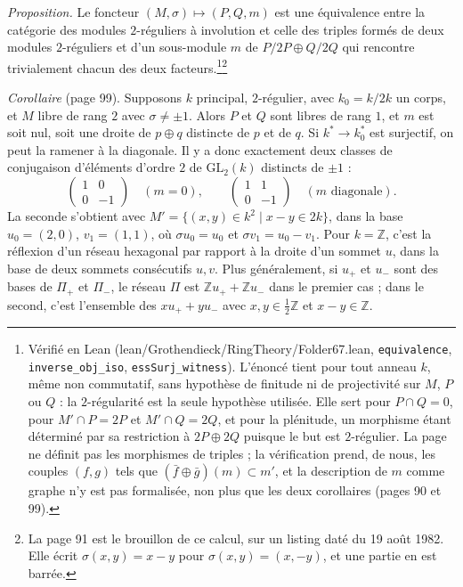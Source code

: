 \documentclass[11pt,a4paper]{article}
\begin{document}
\emph{Proposition.} Le foncteur $(M, \sigma) \mapsto (P, Q, m)$ est une
équivalence entre la catégorie des modules $2$-réguliers à involution et celle
des triples formés de deux modules $2$-réguliers et d'un sous-module $m$ de
$P/2P \oplus Q/2Q$ qui rencontre trivialement chacun des deux
facteurs.\footnote{Vérifié en Lean
(lean/Grothendieck/RingTheory/Folder67.lean, \texttt{equivalence},
\texttt{inverse\_obj\_iso}, \texttt{essSurj\_witness}). L'énoncé tient pour
tout anneau $k$, même non commutatif, sans hypothèse de finitude ni de
projectivité sur $M$, $P$ ou $Q$ : la $2$-régularité est la seule hypothèse
utilisée. Elle sert pour $P \cap Q = 0$, pour $M' \cap P = 2P$ et
$M' \cap Q = 2Q$, et pour la plénitude, un morphisme étant déterminé par sa
restriction à $2P \oplus 2Q$ puisque le but est $2$-régulier. La page ne
définit pas les morphismes de triples ; la vérification prend, de nous, les
couples $(f, g)$ tels que $(\bar f \oplus \bar g)(m) \subset m'$, et la
description de $m$ comme graphe n'y est pas formalisée, non plus que les deux
corollaires (pages 90 et 99).}\footnote{La page 91 est le brouillon de ce calcul, sur un listing
daté du 19 août 1982. Elle écrit $\sigma(x,y) = x - y$ pour
$\sigma(x,y) = (x, -y)$, et une partie en est barrée.}

\emph{Corollaire} (page 99). Supposons $k$ principal, $2$-régulier, avec
$k_0 = k/2k$ un corps, et $M$ libre de rang $2$ avec $\sigma \neq \pm 1$.
Alors $P$ et $Q$ sont libres de rang $1$, et $m$ est soit nul, soit une
droite de $p \oplus q$ distincte de $p$ et de $q$. Si $k^{*} \to k_0^{*}$ est
surjectif, on peut la ramener à la diagonale. Il y a donc exactement deux
classes de conjugaison d'éléments d'ordre $2$ de $\mathrm{GL}_2(k)$ distincts
de $\pm 1$ :
\[
\begin{pmatrix} 1 & 0 \\ 0 & -1 \end{pmatrix} \quad (m = 0),
\qquad
\begin{pmatrix} 1 & 1 \\ 0 & -1 \end{pmatrix} \quad (m \text{ diagonale}).
\]
La seconde s'obtient avec $M' = \{(x,y) \in k^{2} \mid x - y \in 2k\}$, dans
la base $u_0 = (2, 0)$, $v_1 = (1,1)$, où $\sigma u_0 = u_0$ et $\sigma v_1 =
u_0 - v_1$. Pour $k = \mathbb{Z}$, c'est la réflexion d'un réseau
hexagonal par rapport à la droite d'un sommet $u$, dans la base de deux
sommets consécutifs $u, v$. Plus généralement, si $u_{+}$ et $u_{-}$ sont des
bases de $\Pi_{+}$ et $\Pi_{-}$, le réseau $\Pi$ est $\mathbb{Z}u_{+} +
\mathbb{Z}u_{-}$ dans le premier cas ; dans le second, c'est l'ensemble des
$x u_{+} + y u_{-}$ avec $x, y \in \frac12\mathbb{Z}$ et $x - y \in \mathbb{Z}$.
\end{document}
